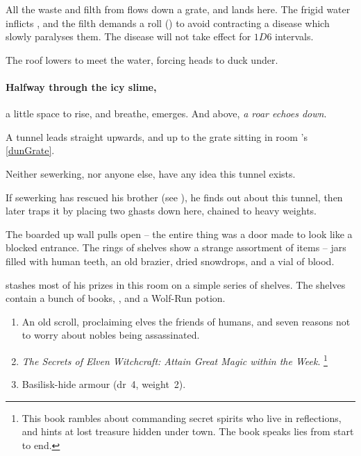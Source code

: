 
All the waste and filth from  flows down a grate, and lands here.
The frigid water inflicts , and the filth demands a  roll (\tn[10]) to avoid contracting a disease which slowly paralyses them.%
The disease will not take effect for $1D6$ \glspl{interval}.

The roof lowers to meet the water, forcing heads to duck under.

\paragraph{Halfway through the icy slime,}
a little space to rise, and breathe, emerges.
And above, \emph{a roar echoes down}.

A tunnel leads straight upwards, and up to the grate sitting in room 's \vref{dunGrate}.

Neither \gls{sewerking}, nor anyone else, have any idea this tunnel exists.

If \gls{sewerking} has rescued his brother (see ), he finds out about this tunnel, then later traps it by placing two ghasts down here, chained to heavy weights.


\begin{boxtext}
  The boarded up wall pulls open -- the entire thing was a door made to look like a blocked entrance.
  The rings of shelves show a strange assortment of items -- jars filled with human teeth, an old brazier, dried snowdrops, and a vial of blood.
\end{boxtext}


 stashes most of his prizes in this room on a simple series of shelves.
The shelves contain a bunch of books, \lootMagic, and a Wolf-Run potion.

\begin{enumerate}
  \item
  An old scroll, proclaiming elves the friends of humans, and seven reasons not to worry about nobles being assassinated.
  \item
  \textit{The Secrets of Elven Witchcraft: Attain Great Magic within the Week}.%
  \footnote{This book rambles about commanding secret spirits who live in reflections, and hints at lost treasure hidden under \gls{town}.
  The book speaks lies from start to end.}
  \item
  Basilisk-hide armour (\gls{dr}~4, \gls{weight}~2).
\end{enumerate}

